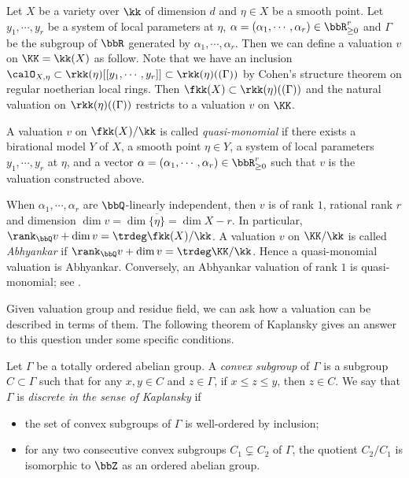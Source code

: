 \begin{example}
	Let $X$ be a variety over $\kk$ of dimension $d$ and $\eta \in X$ be a smooth point.
	Let $y_1,\cdots,y_r$ be a system of local parameters at $\eta$, $\alpha = (\alpha_1,\cdots,\alpha_r) \in \bbR_{\geq 0}^r$ and $\Gamma$ be the subgroup of $\bbR$ generated by $\alpha_1,\cdots,\alpha_r$.
	Then we can define a valuation $v$ on $\KK = \kk(X)$ as follow.
	Note that we have an inclusion $\calO_{X,\eta} \subset \rkk(\eta)[[y_1,\cdots,y_r]] \subset \rkk(\eta)((\Gamma))$ by Cohen's structure theorem on regular noetherian local rings.
	Then $\fkk(X) \subset \rkk(\eta)((\Gamma))$ and the natural valuation on $\rkk(\eta)((\Gamma))$ restricts to a valuation $v$ on $\KK$.

	A valuation $v$ on $\fkk(X)/\kk$ is called \emph{quasi-monomial} if there exists a birational model $Y$ of $X$, a smooth point $\eta \in Y$, a system of local parameters $y_1,\cdots,y_r$ at $\eta$, and a vector $\alpha = (\alpha_1,\cdots,\alpha_r) \in \bbR_{\geq 0}^r$ such that $v$ is the valuation constructed above.

	When $\alpha_1,\cdots,\alpha_r$ are $\bbQ$-linearly independent, then $v$ is of rank $1$, rational rank $r$ and dimension $\dim v = \dim \overline{\{\eta\}} = \dim X - r$.
	In particular, $\rank_\bbQ v + \dim v = \trdeg \fkk(X)/\kk$.
	A valuation $v$ on $\KK/\kk$ is called \emph{Abhyankar} if $\rank_\bbQ v + \dim v = \trdeg \KK/\kk$.
	Hence a quasi-monomial valuation is Abhyankar.
	Conversely, an Abhyankar valuation of rank $1$ is quasi-monomial; see \cite[Propostion 2.8]{Ein-Lazarsfeld-Smith-2003-uniform-approximation-of-Abhyankar-valuation-ideals}.
\end{example}


Given valuation group and residue field, we can ask how a valuation can be described in terms of them.
The following theorem of Kaplansky gives an answer to this question under some specific conditions.

\begin{definition}
	Let $\Gamma$ be a totally ordered abelian group.
	A \emph{convex subgroup} of $\Gamma$ is a subgroup $C \subset \Gamma$ such that for any $x,y \in C$ and $z \in \Gamma$, if $x \leq z \leq y$, then $z \in C$.
	We say that $\Gamma$ is \emph{discrete in the sense of Kaplansky} if
	\begin{itemize}
		\item the set of convex subgroups of $\Gamma$ is well-ordered by inclusion;
		\item for any two consecutive convex subgroups $C_1 \subsetneq C_2$ of $\Gamma$, the quotient $C_2/C_1$ is isomorphic to $\bbZ$ as an ordered abelian group.
	\end{itemize}
\end{definition}

